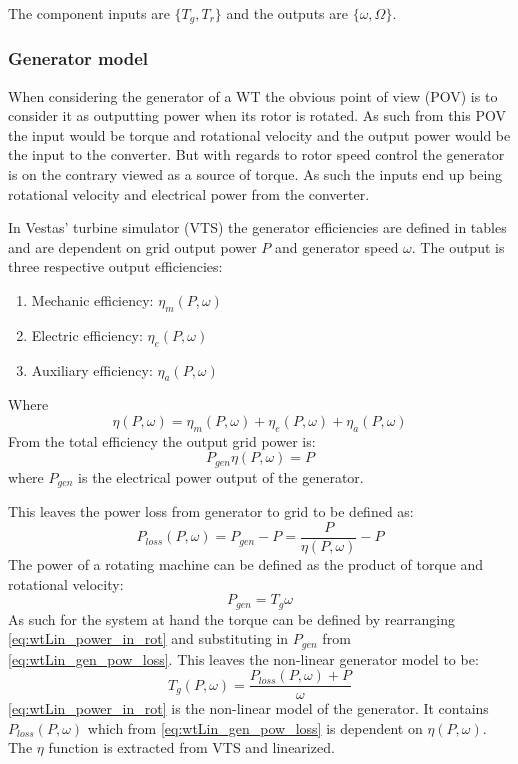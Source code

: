 The component inputs are $ \{T_g, T_r\} $ and the outputs are $ \{\omega, \Omega\} $. 

\subsubsection{Generator model} \label{sec:wtlin_generator}
When considering the generator of a WT the obvious point of view (POV) is to consider it as outputting power when its rotor is rotated. As such from this POV the input would be torque and rotational velocity and the output power would be the input to the converter. But with regards to rotor speed control the generator is on the contrary viewed as a source of torque. As such the inputs end up being rotational velocity and electrical power from the converter.

In Vestas' turbine simulator (VTS) the generator efficiencies are defined in tables and are dependent on grid output power $ P $ and generator speed $ \omega $. The output is three respective output efficiencies: 
\begin{enumerate}
	\item Mechanic efficiency: $ \eta_m(P,\omega) $
	\item Electric efficiency: $ \eta_e(P,\omega) $
	\item Auxiliary efficiency: $ \eta_a(P,\omega) $
\end{enumerate}
Where 
\begin{equation}\label{eq:wtLin_gen_effi}
	\eta(P,\omega) = \eta_m(P,\omega) + \eta_e(P,\omega) + \eta_a(P,\omega)
\end{equation}
From the total efficiency the output grid power is:
\begin{equation}\label{eq:wtLin_gen_elec_pow}
	P_{gen} \eta(P,\omega) = P
\end{equation}
where $ P_{gen} $ is the electrical power output of the generator.

This leaves the power loss from generator to grid to be defined as:
\begin{equation} \label{eq:wtLin_gen_pow_loss}
	P_{loss}(P, \omega) = P_{gen} - P = \dfrac{P}{\eta(P, \omega)} - P
\end{equation}
The power of a rotating machine can be defined as the product of torque and rotational velocity:
\begin{equation}\label{eq:wtLin_power_in_rot}
	P_{gen} = T_g \omega
\end{equation}
As such for the system at hand the torque can be defined by rearranging \cref{eq:wtLin_power_in_rot} and substituting in $ P_{gen} $ from \cref{eq:wtLin_gen_pow_loss}. This leaves the non-linear generator model to be:
\begin{equation}\label{eq:wtLin_gen_torque}
	T_g(P, \omega) = \dfrac{P_{loss}(P, \omega) + P}{\omega}
\end{equation}
\cref{eq:wtLin_power_in_rot} is the non-linear model of the generator. It contains $ P_{loss}(P,\omega) $ which from \cref{eq:wtLin_gen_pow_loss} is dependent on $ \eta(P, \omega) $. The $ \eta $ function is extracted from VTS and linearized.

